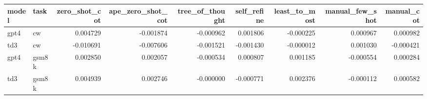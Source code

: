 \begin{tabular}{llrrrrrrr}
\toprule
model & task & zero_shot_cot & ape_zero_shot_cot & tree_of_thought & self_refine & least_to_most & manual_few_shot & manual_cot \\
\midrule
gpt4 & cw & 0.004729 & -0.001874 & -0.000962 & 0.001806 & -0.000225 & 0.000967 & 0.000982 \\
td3 & cw & -0.010691 & -0.007606 & -0.001521 & -0.001430 & -0.000012 & 0.001030 & -0.000421 \\
gpt4 & gsm8k & 0.002850 & 0.002057 & -0.000534 & 0.000807 & 0.001185 & -0.000554 & 0.000284 \\
td3 & gsm8k & 0.004939 & 0.002746 & -0.000000 & -0.000771 & 0.002376 & -0.000112 & 0.000582 \\
\bottomrule
\end{tabular}
